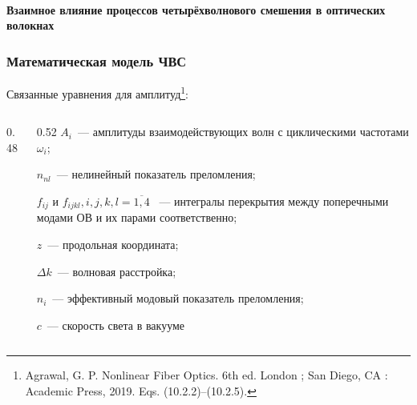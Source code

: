 


\begin{frame}
	\framesubtitle{Взаимное влияние процессов четырёхволнового смешения в оптических волокнах}
	\frametitle{Математическая модель ЧВС}
	Связанные уравнения для амплитуд\footnote{Agrawal, G. P. Nonlinear Fiber Optics. 6th ed. London ; San Diego, CA : Academic Press, 2019. Eqs. (10.2.2)–(10.2.5).}:
	\begin{columns}
		\begin{column}{0.48\textwidth}
		\end{column}
		\begin{column}{0.52\textwidth}
			$A_{{i}}$~--- амплитуды взаимодействующих волн с циклическими частотами $\omega_i$;
			
			$n_{nl}$~--- нелинейный показатель преломления;
			
			$f_{ij}\text{ и }f_{ijkl}, i,j,k,l = \overline{1,4}$ ~--- интегралы перекрытия между поперечными модами ОВ и их парами соответственно;
			
							$z$~--- продольная координата;
			
			$\Delta k$~--- волновая расстройка;
			
			${n_{i}}$~--- эффективный модовый показатель преломления;
			
			$c$~--- скорость света в вакууме
		\end{column}
	\end{columns}
	
	\vfill

\end{frame}



